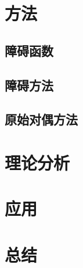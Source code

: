 \documentclass{article}
\begin{document}
\section{方法}
\subsection{障碍函数}
\subsection{障碍方法}
\subsection{原始对偶方法}
\section{理论分析}
\section{应用}
\section{总结}
\end{document}
